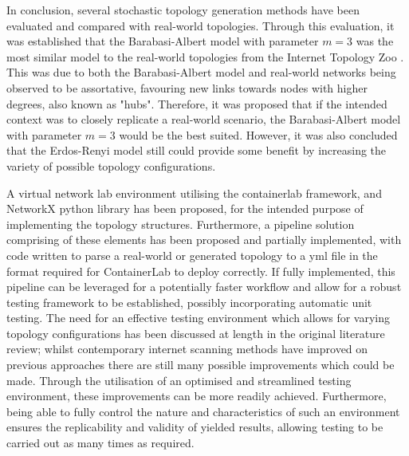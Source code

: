 In conclusion, several stochastic topology generation methods have been evaluated and compared with real-world topologies. Through this evaluation, it was established that the Barabasi-Albert model with parameter $m=3$ was the most similar model to the real-world topologies from the Internet Topology Zoo \cite{topology_zoo}. This was due to both the Barabasi-Albert model and real-world networks being observed to be assortative, favouring new links towards nodes with higher degrees, also known as "hubs". Therefore, it was proposed that if the intended context was to closely replicate a real-world scenario, the Barabasi-Albert model with parameter $m=3$ would be the best suited. However, it was also concluded that the Erdos-Renyi model still could provide some benefit by increasing the variety of possible topology configurations. 

A virtual network lab environment utilising the containerlab\cite{containerlab} framework, and NetworkX \cite{networkX} python library has been proposed, for the intended purpose of implementing the topology structures. Furthermore, a pipeline solution comprising of these elements has been proposed and partially implemented, with code written to parse a real-world or generated topology to a yml file in the format required for ContainerLab to deploy correctly. If fully implemented, this pipeline can be leveraged for a potentially faster workflow and allow for a robust testing framework to be established, possibly incorporating automatic unit testing. The need for an effective testing environment which allows for varying topology configurations has been discussed at length in the original literature review; whilst contemporary internet scanning methods have improved on previous approaches there are still many possible improvements which could be made. Through the utilisation of an optimised and streamlined testing environment, these improvements can be more readily achieved. Furthermore, being able to fully control the nature and characteristics of such an environment ensures the replicability and validity of yielded results, allowing testing to be carried out as many times as required. 

